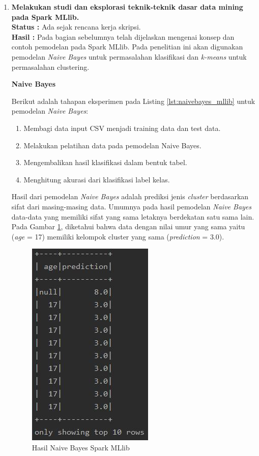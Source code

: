 \documentclass[a4paper,twoside]{article}
\begin{document}
\begin{enumerate}
\begin{lstlisting}[basicstyle=\ttfamily, frame=single,
	columns=fullflexible, keepspaces=true, breaklines=true, label=lst:perulangan, caption=Membuat Fungsi Perulangan pada Scala]
\end{lstlisting}
		
		\item \textbf{Melakukan studi dan eksplorasi teknik-teknik dasar data mining pada Spark MLlib.}\\
		{\bf Status :} Ada sejak rencana kerja skripsi.\\
		{\bf Hasil :} Pada bagian sebelumnya telah dijelaskan mengenai konsep dan contoh pemodelan pada Spark MLlib. Pada penelitian ini akan digunakan pemodelan \textit{Naive Bayes} untuk permasalahan klasifikasi dan \textit{k-means} untuk permasalahan clustering.

\textbf{Naive Bayes}

\noindent Berikut adalah tahapan eksperimen pada Listing \ref{lst:naivebayes_mllib} untuk pemodelan \textit{Naive Bayes}:
\begin{enumerate}
\item Membagi data input CSV menjadi training data dan test data.
\item Melakukan pelatihan data pada pemodelan Naive Bayes.
\item Mengembalikan hasil klasifikasi dalam bentuk tabel.
\item Menghitung akurasi dari klasifikasi label kelas.
\end{enumerate}	

\par Hasil dari pemodelan \textit{Naive Bayes} adalah prediksi jenis \textit{cluster} berdasarkan sifat dari masing-masing data. Umumnya pada hasil pemodelan \textit{Naive Bayes} data-data yang memiliki sifat yang sama letaknya berdekatan satu sama lain. Pada Gambar \ref{fig:mllib_naivebayes}, diketahui bahwa data dengan nilai umur yang sama yaitu (\textit{age} = 17) memiliki kelompok cluster yang sama (\textit{prediction} = 3.0).

\begin{figure}[H]
	\centering
	\includegraphics[scale=0.7]{mllib_naivebayes}
	\caption{Hasil Naive Bayes Spark MLlib}
	\label{fig:mllib_naivebayes}
\end{figure}


\end{enumerate}
\end{document}

